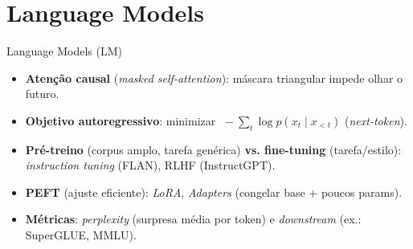 \documentclass{beamer}
\begin{document}
\section{Language Models}
\begin{frame}{Language Models (LM)}
\begin{itemize}
  \item \textbf{Atenção causal} (\textit{masked self-attention}): máscara triangular impede olhar o futuro.
  \item \textbf{Objetivo autoregressivo}: minimizar $\;-\sum_{t}\log p(x_t \mid x_{<t})$ (\textit{next-token}).
  \item \textbf{Pré-treino} (corpus amplo, tarefa genérica) \textbf{vs. fine-tuning} (tarefa/estilo): 
        \emph{instruction tuning} (FLAN), RLHF (InstructGPT).
  \item \textbf{PEFT} (ajuste eficiente): \emph{LoRA}, \emph{Adapters} (congelar base + poucos params).
  \item \textbf{Métricas}: 
        \emph{perplexity} (surpresa média por token) e \emph{downstream} (ex.: SuperGLUE, MMLU).
\end{itemize}
\end{frame}
\end{document}
